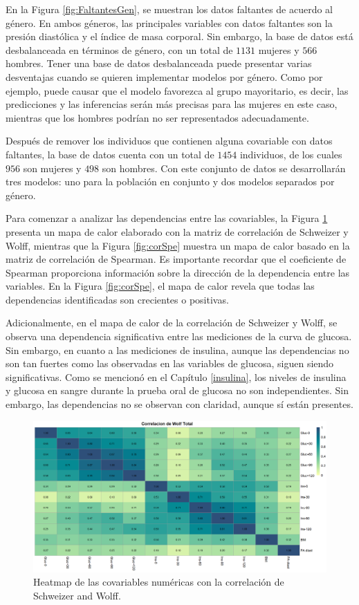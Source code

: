 En la Figura \ref{fig:FaltantesGen}, se muestran los datos faltantes de acuerdo al género. En ambos géneros, las principales variables con datos faltantes son la presión diastólica y el índice de masa corporal. Sin embargo, la base de datos está desbalanceada en términos de género, con un total de $1131$ mujeres y $566$ hombres. Tener una base de datos desbalanceada puede presentar varias desventajas cuando se quieren implementar modelos por género. Como por ejemplo, puede causar que el modelo favorezca al grupo mayoritario, es decir, las predicciones y las inferencias serán más precisas para las mujeres en este caso, mientras que los hombres podrían no ser representados adecuadamente.

Después de remover los individuos que contienen alguna covariable con datos faltantes, la base de datos cuenta con un total de $1454$ individuos, de los cuales $956$ son mujeres y $498$ son hombres. Con este conjunto de datos se desarrollarán tres modelos: uno para la población en conjunto y dos modelos separados por género.

Para comenzar a analizar las dependencias entre las covariables, la Figura \ref{fig:corrSWE} presenta un mapa de calor elaborado con la matriz de correlación de Schweizer y Wolff, mientras que la Figura \ref{fig:corSpe} muestra un mapa de calor basado en la matriz de correlación de Spearman. Es importante recordar que el coeficiente de Spearman proporciona información sobre la dirección de la dependencia entre las variables. En la Figura \ref{fig:corSpe}, el mapa de calor revela que todas las dependencias identificadas son crecientes o positivas.

Adicionalmente, en el mapa de calor de la correlación de Schweizer y Wolff, se observa una dependencia significativa entre las mediciones de la curva de glucosa. Sin embargo, en cuanto a las mediciones de insulina, aunque las dependencias no son tan fuertes como las observadas en las variables de glucosa, siguen siendo significativas. Como se mencionó en el Capítulo \ref{insulina}, los niveles de insulina y glucosa en sangre durante la prueba oral de glucosa no son independientes. Sin embargo, las dependencias no se observan con claridad, aunque sí están presentes. 

\begin{figure}[H]
    \centering
    \includegraphics[width = 0.9 \textwidth]{Imagenes/corWolfTotal.png}
    \caption{Heatmap de las covariables numéricas con la correlación de Schweizer and Wolff.}
    \label{fig:corrSWE}
\end{figure}


